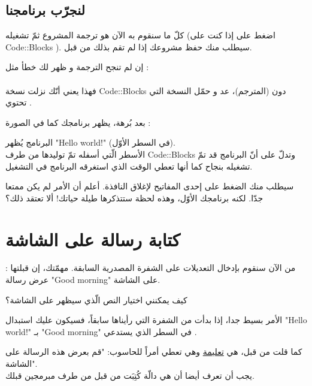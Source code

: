 \subsection{لنجرّب برنامجنا}
كلّ ما سنقوم به الآن هو ترجمة المشروع ثمّ تشغيله (اضغط على
 إذا كنت على
\textenglish{Code::Blocks}
). سيطلب منك حفظ مشروعك إذا لم تقم بذلك من قبل.

\begin{critical}
  إن لم تنجح الترجمة و ظهر لك خطأ مثل :\\
\\
فهذا يعني أنّك نزلت نسخة
Code::Blocks
 دون
 (المترجم)، عد و حمّل النسخة التي تحتوي
.
\end{critical}

بعد بُرهة، يظهر برنامجك كما في الصورة :

البرنامج يُظهر
"\textenglish{Hello world!}"
 (في السطر الأوّل).\\
الأسطر الّتي أسفله تمّ توليدها من طرف
\textenglish{Code::Blocks}
 وتدلّ على أنّ البرنامج قد تمّ تشغيله بنجاح كما أنها تعطي الوقت الذي استغرقه البرنامج في التشغيل.

 سيطلب منك الضغط على إحدى المفاتيح لإغلاق النافذة. أعلم أن الأمر لم يكن ممتعا جدّا. لكنه برنامجك الأوّل، وهذه لحظة ستتذكرها طيلة حياتك! ألا تعتقد ذلك؟

\section{كتابة رسالة على الشاشة}
من الآن سنقوم بإدخال التعديلات على الشفرة المصدرية السابقة. مهمّتك، إن قبلتها : عرض رسالة
"\textenglish{Good morning}"
 على الشاشة.

\begin{question}
  كيف يمكنني اختيار النص الّذي سيظهر على الشاشة؟
\end{question}

الأمر بسيط جدا، إذا بدأت من الشفرة التي رأيناها سابقاً، فسيكون عليك استبدال
"\textenglish{Hello world!}"
 بـ
"\textenglish{Good morning}"
 في السطر الذي يستدعي
.

كما قلت من قبل،
 هي
\underline{تعليمة}
 وهي تعطي أمراً للحاسوب: "قم بعرض هذه الرسالة على الشاشة".\\
يجب أن تعرف أيضا أن
 هي دالّة كُتِبَت من قبل من طرف مبرمجين قبلك.

